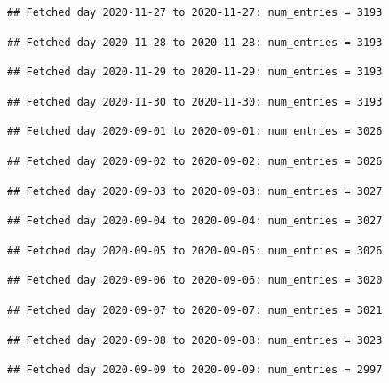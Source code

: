 \documentclass[]{article}
\begin{document}
\begin{verbatim}
## Fetched day 2020-11-27 to 2020-11-27: num_entries = 3193
\end{verbatim}

\begin{verbatim}
## Fetched day 2020-11-28 to 2020-11-28: num_entries = 3193
\end{verbatim}

\begin{verbatim}
## Fetched day 2020-11-29 to 2020-11-29: num_entries = 3193
\end{verbatim}

\begin{verbatim}
## Fetched day 2020-11-30 to 2020-11-30: num_entries = 3193
\end{verbatim}

\begin{verbatim}
## Fetched day 2020-09-01 to 2020-09-01: num_entries = 3026
\end{verbatim}

\begin{verbatim}
## Fetched day 2020-09-02 to 2020-09-02: num_entries = 3026
\end{verbatim}

\begin{verbatim}
## Fetched day 2020-09-03 to 2020-09-03: num_entries = 3027
\end{verbatim}

\begin{verbatim}
## Fetched day 2020-09-04 to 2020-09-04: num_entries = 3027
\end{verbatim}

\begin{verbatim}
## Fetched day 2020-09-05 to 2020-09-05: num_entries = 3026
\end{verbatim}

\begin{verbatim}
## Fetched day 2020-09-06 to 2020-09-06: num_entries = 3020
\end{verbatim}

\begin{verbatim}
## Fetched day 2020-09-07 to 2020-09-07: num_entries = 3021
\end{verbatim}

\begin{verbatim}
## Fetched day 2020-09-08 to 2020-09-08: num_entries = 3023
\end{verbatim}

\begin{verbatim}
## Fetched day 2020-09-09 to 2020-09-09: num_entries = 2997
\end{verbatim}
\end{document}
